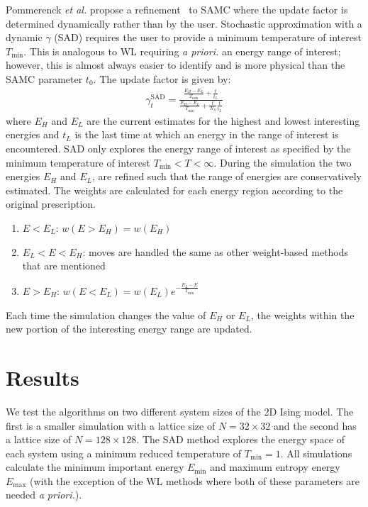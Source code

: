 Pommerenck \emph{et al.} propose a refinement~\cite{pommerenck2020stochastic} to SAMC
where the update factor is determined dynamically rather than by the user.
Stochastic approximation with a dynamic $\gamma$ (SAD) requires the user to
provide a minimum temperature of interest $T_{\min}$. This is analogous to WL
requiring \emph{a priori.} an energy range of interest; however, this is almost always easier to
identify and is more physical than the SAMC parameter $t_0$. The
update factor is given by:
\begin{align}
  \gamma_{t}^{\text{SAD}} =
     \frac{
       \frac{E_{H}-E_{L}}{T_{\text{min}}} + \frac{t}{t_L}
     }{
       \frac{E_{H}-E_{L}}{T_{\text{min}}} + \frac{t}{N_S}\frac{t}{t_L}
     }
\end{align}
where $E_H$ and $E_L$ are the current estimates for the highest and
lowest interesting energies and $t_L$ is the last time at which an
energy in the range of interest is encountered.
%
SAD only explores the energy range of interest as specified by the minimum
temperature of interest $T_{\min} < T < \infty$. During the simulation the two
energies $E_H$ and $E_L$, are refined such that the range of energies are
conservatively estimated. The weights are calculated for each energy region according to the original prescription.
\begin{enumerate}
\item {$E < E_L$:} $w(E>E_H) = w(E_H)$
\item {$E_L < E < E_H$:} moves are handled the same as other weight-based
methods that are mentioned
\item {$E > E_H$:} $w(E<E_L) = w(E_L)e^{-\frac{E_L-E}{T_{\min}}}$
\end{enumerate}
Each time the simulation changes the value of $E_H$ or $E_L$, the weights
within the new portion of the interesting energy range are updated.

\section{Results}
We test the algorithms on two different system sizes of the 2D Ising model.
The first is a smaller simulation with a lattice size of $N = 32 \times 32$ and
the second has a lattice size of $N = 128 \times 128$. The SAD method explores 
the energy space of each system using a minimum reduced temperature of $T_{\text{min}} = 1$. All simulations calculate the minimum important energy $E_{\min}$
and maximum entropy energy $E_{\max}$ (with the exception of the WL methods
where both of these parameters are needed \emph{a priori.}).

